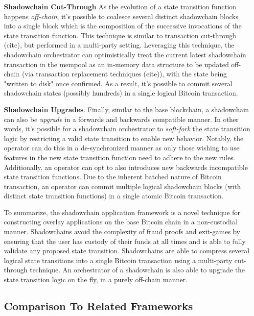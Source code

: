 \documentclass[10pt,a4paper]{article}
\theoremstyle{definition}
\begin{document}
\textbf{Shadowchain Cut-Through} As the evolution of a state transition
function happens \emph{off-chain}, it's possible to coalesce several distinct
shadowchain blocks into a single block which is the composition of the
successive invocations of the state transition function. This technique is
similar to transaction cut-through (cite), but performed in a multi-party
setting. Leveraging this technique, the shadowchain orchestrator can optimistically
treat the current latest shadowchain transaction in the mempool as an in-memory
data structure to be updated off-chain (via transaction replacement techniques
(cite)), with the state being "written to disk" once confirmed. As a result,
it's possible to commit several shadowchain states (possibly hundreds) in a
single logical Bitcoin transaction.

\textbf{Shadowchain Upgrades}. Finally, similar to the base blockchain, a
shadowchain can also be \emph{upgrade} in a forwards and backwards compatible
manner. In other words, it's possible for a shadowchain orchestrator to
\emph{soft-fork} the state transition logic by restricting a valid state
transition to enable new behavior. Notably, the operator can do this in a
de-synchronized manner as only those wishing to use features in the new state
transition function need to adhere to the new rules. Additionally, an operator
can opt to also introduces new backwards incompatible state transition functions.
Due to the inherent batched nature of Bitcoin transaction, an operator can
commit multiple logical shadowchain blocks (with distinct state transition
functions) in a single atomic Bitcoin transaction.

To summarize, the shadowchain application framework is a novel technique for
constructing overlay applications on the base Bitcoin chain in a non-custodial
manner. Shadowchains avoid the complexity of fraud proofs and exit-games by
ensuring that the user has custody of their funds at all times and is able to
fully validate any proposed state transition. Shadowchains are able to compress
several logical state transitions into a single Bitcoin transaction using a
multi-party cut-through technique. An orchestrator of a shadowchain is also
able to upgrade the state transition logic on the fly, in a purely off-chain
manner.


\subsection{Comparison To Related Frameworks}
\end{document}
